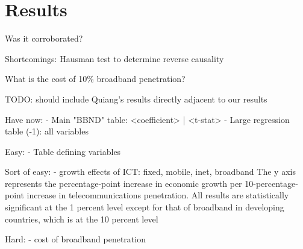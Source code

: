 \section{Results}
\label{sec:results}

Was it corroborated?

Shortcomings: Hausman test to determine reverse causality

What is the cost of 10\% broadband penetration?

TODO: should include Quiang's results directly adjacent to our results

Have now:
  - Main "BBND" table: <coefficient> | <t-stat>
  - Large regression table (-1): all variables

Easy:
  - Table defining variables


Sort of easy:
  - growth effects of ICT: fixed, mobile, inet, broadband
    The y axis represents the percentage-point increase in economic growth per
    10-percentage-point increase in telecommunications penetration. All
    results are statistically significant at the 1 percent level except for
    that of broadband in developing countries, which is at the 10 percent
    level

Hard:
   - cost of broadband penetration
